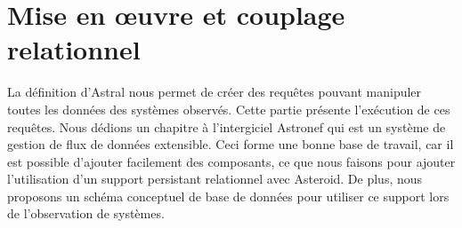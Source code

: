 \part{Mise en œuvre et couplage relationnel}
La définition d'Astral nous permet de créer des requêtes pouvant manipuler toutes les données des systèmes observés. Cette partie présente l'exécution de ces requêtes. Nous dédions un chapitre à l'intergiciel Astronef qui est un système de gestion de flux de données extensible. Ceci forme une bonne base de travail, car il est possible d'ajouter facilement des composants, ce que nous faisons pour ajouter l'utilisation d'un support persistant relationnel avec Asteroid. De plus, nous proposons un schéma conceptuel de base de données pour utiliser ce support lors de l'observation de systèmes.




